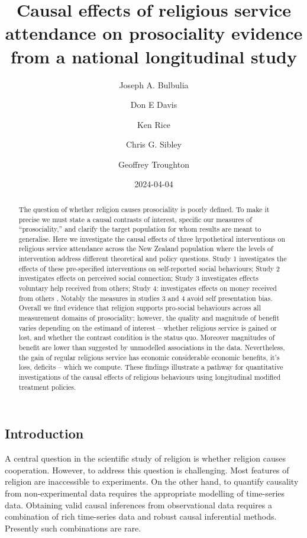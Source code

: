 \documentclass[
  singlecolumn]{article}
\title{Causal effects of religious service attendance on prosociality
evidence from a national longitudinal study}
\author{Joseph A. Bulbulia \and Don E Davis \and Ken Rice \and Chris G.
Sibley \and Geoffrey Troughton}
\date{2024-04-04}
\begin{document}
\maketitle
\begin{abstract}
The question of whether religion causes prosociality is poorly defined.
To make it precise we must state a causal contrasts of interest,
specific our measures of ``prosociality,'' and clarify the target
population for whom results are meant to generalise. Here we investigate
the causal effects of three hypothetical interventions on religious
service attendance across the New Zealand population where the levels of
intervention address different theoretical and policy questions. Study 1
investigates the effects of these pre-specified interventions on
self-reported social behaviours; Study 2 investigates effects on
perceived social connection; Study 3 investigates effects voluntary help
received from others; Study 4: investigates effects on money received
from others . Notably the measures in studies 3 and 4 avoid self
presentation bias. Overall we find evidence that religion supports
pro-social behaviours across all measurement domains of prosociality;
however, the quality and magnitude of benefit varies depending on the
estimand of interest -- whether religious service is gained or lost, and
whether the contrast condition is the status quo. Moreover magnitudes of
benefit are lower than suggested by unmodelled associations in the data.
Nevertheless, the gain of regular religious service has economic
considerable economic benefits, it's loss, deficits -- which we compute.
These findings illustrate a pathway for quantitative investigations of
the causal effects of religious behaviours using longitudinal modified
treatment policies.
\end{abstract}

\subsection{Introduction}\label{introduction}

A central question in the scientific study of religion is whether
religion causes cooperation. However, to address this question is
challenging. Most features of religion are inaccessible to experiments.
On the other hand, to quantify causality from non-experimental data
requires the appropriate modelling of time-series data. Obtaining valid
causal inferences from observational data requires a combination of rich
time-series data and robust causal inferential methods. Presently such
combinations are rare.
\end{document}
